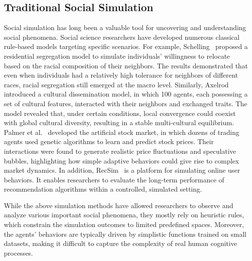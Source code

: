 \documentclass{article}
\theoremstyle{definition}
\theoremstyle{theorem}
\theoremstyle{proof}
\theoremstyle{remark}
\begin{document}
\subsection{Traditional Social Simulation}
    Social simulation has long been a valuable tool for uncovering and understanding social phenomena. Social science researchers have developed numerous classical rule-based models targeting specific scenarios.
    For example, Schelling~\cite{schelling1971dynamic} proposed a residential segregation model to simulate individuals’ willingness to relocate based on the racial composition of their neighbors. The results demonstrated that even when individuals had a relatively high tolerance for neighbors of different races, racial segregation still emerged at the macro level.
    Similarly, Axelrod~\cite{axelrod1997dissemination} introduced a cultural dissemination model, in which 100 agents, each possessing a set of cultural features, interacted with their neighbors and exchanged traits. The model revealed that, under certain conditions, local convergence could coexist with global cultural diversity, resulting in a stable multi-cultural equilibrium.
    Palmer et al.~\cite{palmer1999artificial} developed the artificial stock market, in which dozens of trading agents used genetic algorithms to learn and predict stock prices. Their interactions were found to generate realistic price fluctuations and speculative bubbles, highlighting how simple adaptive behaviors could give rise to complex market dynamics.
    In addition, RecSim~\cite{ie2019recsim} is a platform for simulating online user behaviors.
    It enables researchers to evaluate the long-term performance of recommendation algorithms within a controlled, simulated setting.

    While the above simulation methods have allowed researchers to observe and analyze various important social phenomena, they mostly rely on heuristic rules, which constrain the simulation outcomes to limited predefined spaces. Moreover, the agents' behaviors are typically driven by simplistic functions trained on small datasets, making it difficult to capture the complexity of real human cognitive processes.
    
    
\end{document}
